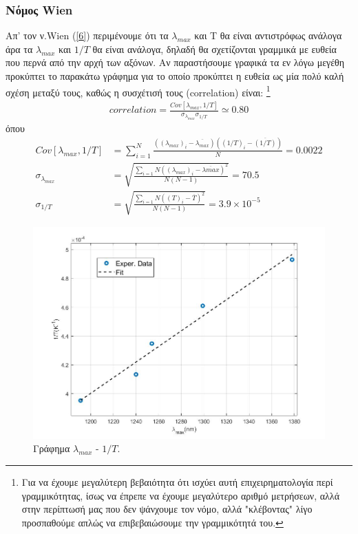 \documentclass[a4paper]{article}
\begin{document}
\subsubsection*{Νόμος Wien}

Απ' τον ν.Wien (\ref{6}) περιμένουμε ότι τα $\lambda_{max}$ και Τ θα είναι αντιστρόφως ανάλογα άρα τα $\lambda_{max}$ και $1/T$ θα είναι ανάλογα, δηλαδή θα σχετίζονται γραμμικά με ευθεία που περνά από την αρχή των αξόνων. Αν παραστήσουμε γραφικά τα εν λόγω μεγέθη προκύπτει το παρακάτω γράφημα για το οποίο προκύπτει η ευθεία ως μία πολύ καλή σχέση μεταξύ τους, καθώς η συσχέτισή τους (correlation) είναι: 
\footnote{Για να έχουμε μεγαλύτερη βεβαιότητα ότι ισχύει αυτή επιχειρηματολογία περί γραμμικότητας, ίσως να έπρεπε να έχουμε μεγαλύτερο αριθμό μετρήσεων, αλλά στην περίπτωσή μας που δεν ψάνχουμε τον νόμο, αλλά "κλέβοντας" λίγο προσπαθούμε απλώς να επιβεβαιώσουμε την γραμμικότητά του.}
\begin{align*}
correlation =\frac{ Cov[\lambda_{max},1/T]}{\sigma_{\lambda_{max}}\sigma_{1/T}} \simeq 0.80
\end{align*} 
όπου 
\begin{align*}
Cov[\lambda_{max},1/T] &= \sum_{i=1}^{N} \frac{((\lambda_{max})_i -\overline{\lambda_{max}})((1/				T)_i -\overline{(1/T)})}{N} = 0.0022    \\ 
\sigma_{\lambda_{max}} &=  \sqrt{\frac{\sum_{i=1}{N} ((\lambda_{max})_i -											\overline{\lambda{max}})^2   }{N(N-1)}} = 70.5    \\ 
\sigma_{1/T}           &=   \sqrt{\frac{\sum_{i=1}{N} ((T)_i -\overline{T})^2   }{N(N-1)}} = 3.9\times10^{-5}
\end{align*}



\begin{figure}[h!]
\centering 
\caption{ Γράφημα $\lambda_{max}$ - $1/T$.}
\includegraphics[scale=0.5]{wien_exper.jpg}
\end{figure}
\end{document}
